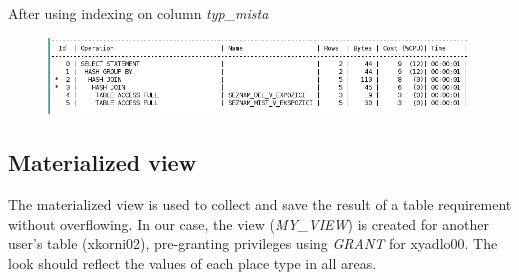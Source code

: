 \documentclass[12pt,a4paper]{article}
\begin{document}
After using indexing on column \textit{typ\_mista}

\begin{figure}[h!]
    \centering
    \includegraphics[width=\textwidth,height=\textheight,keepaspectratio]
    {new_explain_plan.png}
\end{figure}

\subsection{Materialized view}

The materialized view is used to collect and save the result of a table 
requirement without overflowing. In our case, the view (\textit{MY\_VIEW}) is 
created for another user's table (xkorni02), pre-granting privileges using 
\textit{GRANT} for xyadlo00. The look should reflect the values of each place 
type in all areas.
\end{document}
